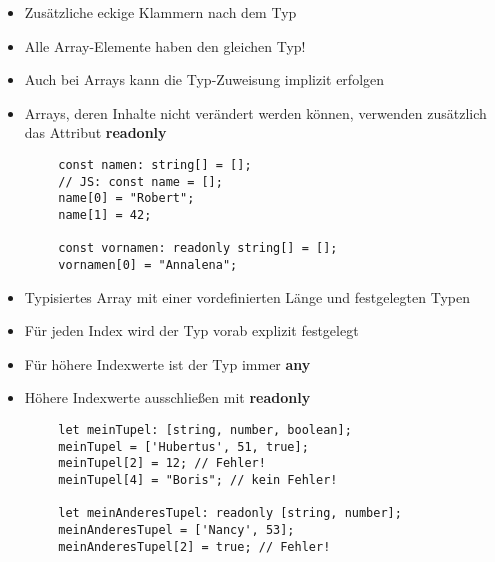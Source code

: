 \documentclass[10pt]{article}
\begin{document}
    \begin{tcolorbox}[
    colback=Yellow!5!white,
    colframe=Yellow!75!black,
    title={\centering Arrays}]
    \begin{itemize}
        \item Zusätzliche eckige Klammern nach dem Typ
        \item Alle Array-Elemente haben den gleichen Typ!
        \item Auch bei Arrays kann die Typ-Zuweisung implizit erfolgen
        \item Arrays, deren Inhalte nicht verändert werden können, verwenden zusätzlich das Attribut \textbf{readonly}
    \end{itemize}
    \begin{lstlisting}
        const namen: string[] = [];
        // JS: const name = [];
        name[0] = "Robert";
        name[1] = 42;

        const vornamen: readonly string[] = [];
        vornamen[0] = "Annalena";
    \end{lstlisting}
    \end{tcolorbox}

    \begin{tcolorbox}[
    colback=Green!5!white,
    colframe=Green!75!black,
    title={\centering Tupel}]
    \begin{itemize}
        \item Typisiertes Array mit einer vordefinierten Länge und festgelegten Typen
        \item Für jeden Index wird der Typ vorab explizit festgelegt
        \item Für höhere Indexwerte ist der Typ immer \textbf{any}
        \item Höhere Indexwerte ausschließen mit \textbf{readonly}
    \end{itemize}
    \begin{lstlisting}
        let meinTupel: [string, number, boolean];
        meinTupel = ['Hubertus', 51, true];
        meinTupel[2] = 12; // Fehler!
        meinTupel[4] = "Boris"; // kein Fehler!
        
        let meinAnderesTupel: readonly [string, number];
        meinAnderesTupel = ['Nancy', 53];
        meinAnderesTupel[2] = true; // Fehler!
    \end{lstlisting}
    \end{tcolorbox}
\end{document}
